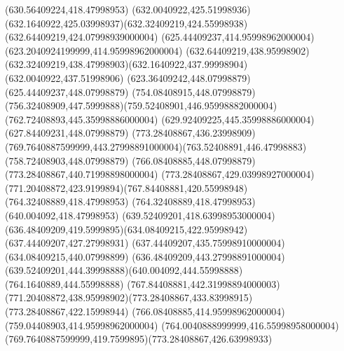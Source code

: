 {{	\lineto(630.56409224,418.47998953)
	\closepath
	\moveto(632.0040922,425.51998936)
	\curveto(632.1640922,425.03998937)(632.32409219,424.55998938)(632.64409219,424.07998939000004)
	\lineto(625.44409237,414.95998962000004)
	\lineto(623.2040924199999,414.95998962000004)
	\closepath
	\moveto(632.64409219,438.95998902)
	\curveto(632.32409219,438.47998903)(632.1640922,437.99998904)(632.0040922,437.51998906)
	\lineto(623.36409242,448.07998879)
	\lineto(625.44409237,448.07998879)
	\closepath
	\moveto(754.08408915,448.07998879)
	\curveto(756.32408909,447.5999888)(759.52408901,446.95998882000004)(762.72408893,445.35998886000004)
	\lineto(629.92409225,445.35998886000004)
	\lineto(627.84409231,448.07998879)
	\closepath
	\moveto(773.28408867,436.23998909)
	\curveto(769.7640887599999,443.27998891000004)(763.52408891,446.47998883)(758.72408903,448.07998879)
	\lineto(766.08408885,448.07998879)
	\lineto(773.28408867,440.71998898000004)
	\closepath
	\moveto(773.28408867,429.03998927000004)
	\curveto(771.20408872,423.9199894)(767.84408881,420.55998948)(764.32408889,418.47998953)
	\lineto(764.32408889,418.47998953)
	\lineto(640.004092,418.47998953)
	\curveto(639.52409201,418.63998953000004)(636.48409209,419.5999895)(634.08409215,422.95998942)
	\lineto(637.44409207,427.27998931)
	\lineto(637.44409207,435.75998910000004)
	\lineto(634.08409215,440.07998899)
	\curveto(636.48409209,443.27998891000004)(639.52409201,444.39998888)(640.004092,444.55998888)
	\lineto(764.1640889,444.55998888)
	\curveto(767.84408881,442.31998894000003)(771.20408872,438.95998902)(773.28408867,433.83998915)
	\closepath
	\moveto(773.28408867,422.15998944)
	\lineto(766.08408885,414.95998962000004)
	\lineto(759.04408903,414.95998962000004)
	\curveto(764.0040888999999,416.55998958000004)(769.7640887599999,419.7599895)(773.28408867,426.63998933)
	\closepath
}
}
{
}
